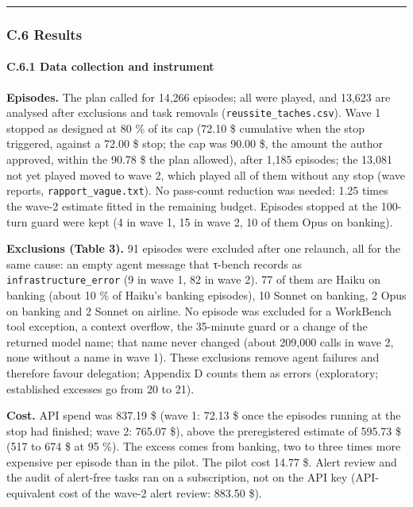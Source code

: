 \begin{center}\rule{0.5\linewidth}{0.5pt}\end{center}

\subsubsection{C.6 Results}\label{c.6-results}

\paragraph{C.6.1 Data collection and instrument}\label{c.6.1-data-collection-and-instrument}

\textbf{Episodes.} The plan called for 14,266 episodes; all were played, and 13,623 are analysed after exclusions and task removals (\texttt{reussite\_\allowbreak{}taches.\allowbreak{}csv}). Wave 1 stopped as designed at 80 \% of its cap (72.10 \$ cumulative when the stop triggered, against a 72.00 \$ stop; the cap was 90.00 \$, the amount the author approved, within the 90.78 \$ the plan allowed), after 1,185 episodes; the 13,081 not yet played moved to wave 2, which played all of them without any stop (wave reports, \texttt{rapport\_\allowbreak{}vague.\allowbreak{}txt}). No pass-count reduction was needed: 1.25 times the wave-2 estimate fitted in the remaining budget. Episodes stopped at the 100-turn guard were kept (4 in wave 1, 15 in wave 2, 10 of them Opus on banking).

\textbf{Exclusions (Table 3).} 91 episodes were excluded after one relaunch, all for the same cause: an empty agent message that τ-bench records as \texttt{infrastructure\_\allowbreak{}error} (9 in wave 1, 82 in wave 2). 77 of them are Haiku on banking (about 10 \% of Haiku's banking episodes), 10 Sonnet on banking, 2 Opus on banking and 2 Sonnet on airline. No episode was excluded for a WorkBench tool exception, a context overflow, the 35-minute guard or a change of the returned model name; that name never changed (about 209,000 calls in wave 2, none without a name in wave 1). These exclusions remove agent failures and therefore favour delegation; Appendix D counts them as errors (exploratory; established excesses go from 20 to 21).

\textbf{Cost.} API spend was 837.19 \$ (wave 1: 72.13 \$ once the episodes running at the stop had finished; wave 2: 765.07 \$), above the preregistered estimate of 595.73 \$ (517 to 674 \$ at 95 \%). The excess comes from banking, two to three times more expensive per episode than in the pilot. The pilot cost 14.77 \$. Alert review and the audit of alert-free tasks ran on a subscription, not on the API key (API-equivalent cost of the wave-2 alert review: 883.50 \$).

